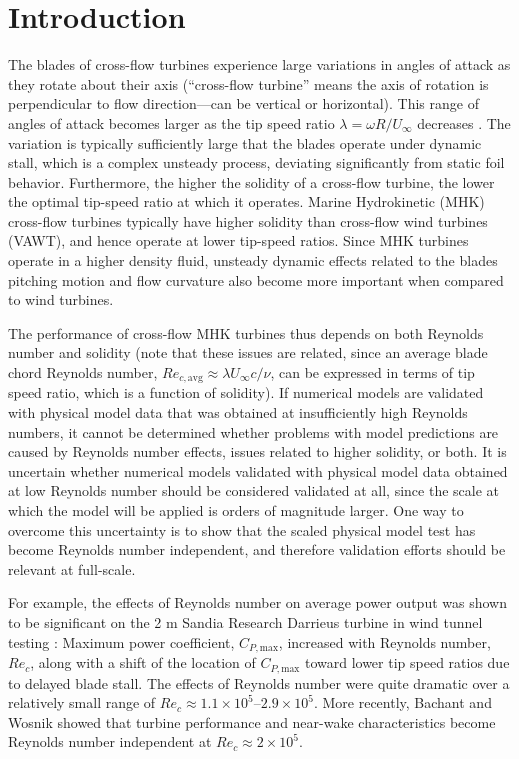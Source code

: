 \documentclass[14pt,letterpaper]{scrreprt}
\begin{document}
\tableofcontents

\chapter{Introduction}

The blades of cross-flow turbines experience large variations in angles of
attack as they rotate about their axis (``cross-flow turbine'' means the axis of
rotation is perpendicular to flow direction---can be vertical or horizontal).
This range of angles of attack becomes larger as the tip speed ratio
$\lambda=\omega R/U_\infty$ decreases \cite{Para2002}. The variation is
typically sufficiently large that the blades operate under dynamic stall, which
is a complex unsteady process, deviating significantly from static foil
behavior. Furthermore, the higher the solidity of a cross-flow turbine, the
lower the optimal tip-speed ratio at which it operates. Marine Hydrokinetic
(MHK) cross-flow turbines typically have higher solidity than cross-flow wind
turbines (VAWT), and hence operate at lower tip-speed ratios. Since MHK turbines
operate in a higher density fluid, unsteady dynamic effects related to the
blades pitching motion and flow curvature also become more important when
compared to wind turbines.

The performance of cross-flow MHK turbines thus depends on both Reynolds number
and solidity (note that these issues are related, since an average blade chord
Reynolds number, $Re_{c,\mathrm{avg}} \approx \lambda U_\infty c/ \nu$, can be
expressed in terms of tip speed ratio, which is a function of solidity). If
numerical models are validated with physical model data that was obtained at
insufficiently high Reynolds numbers, it cannot be determined whether problems
with model predictions are caused by Reynolds number effects, issues related to
higher solidity, or both. It is uncertain whether numerical models validated
with physical model data obtained at low Reynolds number should be considered
validated at all, since the scale at which the model will be applied is orders
of magnitude larger. One way to overcome this uncertainty is to show that the
scaled physical model test has become Reynolds number independent, and therefore
validation efforts should be relevant at full-scale. 

For example, the effects of Reynolds number on average power output was shown to
be significant on the 2 m Sandia Research Darrieus turbine in wind tunnel
testing \cite{Blackwell1976}: Maximum power coefficient, $C_{P,\mathrm{max}}$,
increased with Reynolds number, $Re_c$, along with a shift of the location of
$C_{P,\mathrm{max}}$ toward lower tip speed ratios due to delayed blade stall.
The effects of Reynolds number were quite dramatic over a relatively small range
of $Re_c \approx 1.1 \times 10^5$--$2.9 \times 10^5$. More recently, Bachant and
Wosnik \cite{Bachant2014} showed that turbine performance and near-wake
characteristics become Reynolds number independent at $Re_c \approx 2 \times
10^5$.
\end{document}
